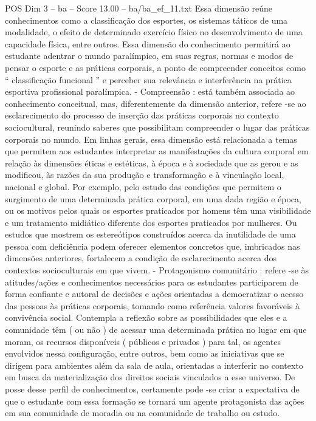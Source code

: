 \begin{textsample}{POS Dim 3 – ba – Score 13.00 – ba/ba\_ef\_11.txt}
Essa dimensão reúne conhecimentos como a classificação dos esportes, os sistemas táticos de uma modalidade, o efeito de determinado exercício físico no desenvolvimento de uma capacidade física, entre outros.
Essa dimensão do conhecimento permitirá ao estudante adentrar o mundo paralímpico, em suas regras, normas e modos de pensar o esporte e as práticas corporais, a ponto de compreender conceitos como “ classificação funcional ” e perceber sua relevância e interferência na prática esportiva profissional paralímpica. - Compreensão : está também associada ao conhecimento conceitual, mas, diferentemente da dimensão anterior, refere -se ao esclarecimento do processo de inserção das práticas corporais no contexto sociocultural, reunindo saberes que possibilitam compreender o lugar das práticas corporais no mundo.
Em linhas gerais, essa dimensão está relacionada a temas que permitem aos estudantes interpretar as manifestações da cultura corporal em relação às dimensões éticas e estéticas, à época e à sociedade que as gerou e as modificou, às razões da sua produção e transformação e à vinculação local, nacional e global.
Por exemplo, pelo estudo das condições que permitem o surgimento de uma determinada prática corporal, em uma dada região e época, ou os motivos pelos quais os esportes praticados por homens têm uma visibilidade e um tratamento midiático diferente dos esportes praticados por mulheres.
Ou estudos que mostrem os estereótipos construídos acerca da inutilidade de uma pessoa com deficiência podem oferecer elementos concretos que, imbricados nas dimensões anteriores, fortalecem a condição de esclarecimento acerca dos contextos socioculturais em que vivem. - Protagonismo comunitário : refere -se às atitudes/ações e conhecimentos necessários para os estudantes participarem de forma confiante e autoral de decisões e ações orientadas a democratizar o acesso das pessoas às práticas corporais, tomando como referência valores favoráveis à convivência social.
Contempla a reflexão sobre as possibilidades que eles e a comunidade têm ( ou não ) de acessar uma determinada prática no lugar em que moram, os recursos disponíveis ( públicos e privados ) para tal, os agentes envolvidos nessa configuração, entre outros, bem como as iniciativas que se dirigem para ambientes além da sala de aula, orientadas a interferir no contexto em busca da materialização dos direitos sociais vinculados a esse universo.
De posse desse perfil de conhecimentos, certamente pode -se criar a expectativa de que o estudante com essa formação se tornará um agente protagonista das ações em sua comunidade de moradia ou na comunidade de trabalho ou estudo.

\end{textsample}
